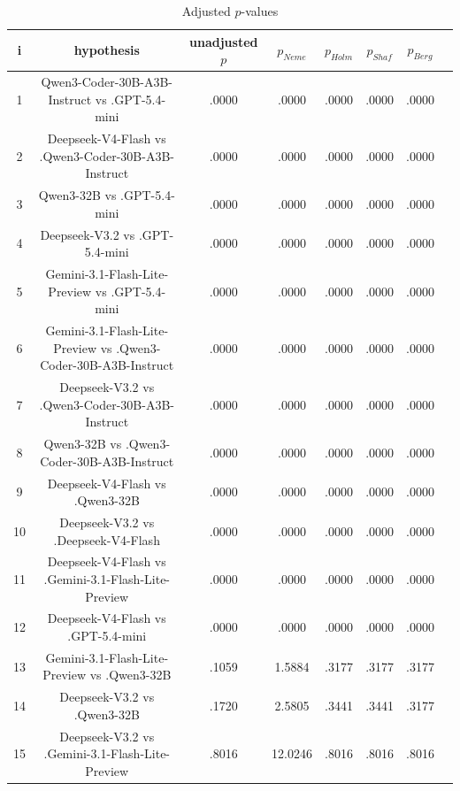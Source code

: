 \documentclass[a4paper,10pt]{article}
\begin{document}
\begin{landscape}
\begin{table}[!htp]
\centering\tiny
\caption{Adjusted $p$-values}
\begin{tabular}{cccccccc}
i&hypothesis&unadjusted $p$&$p_{Neme}$&$p_{Holm}$&$p_{Shaf}$&$p_{Berg}$\\
\hline
1&Qwen3-Coder-30B-A3B-Instruct vs .GPT-5.4-mini&.0000&.0000&.0000&.0000&.0000\\2&Deepseek-V4-Flash vs .Qwen3-Coder-30B-A3B-Instruct&.0000&.0000&.0000&.0000&.0000\\3&Qwen3-32B vs .GPT-5.4-mini&.0000&.0000&.0000&.0000&.0000\\4&Deepseek-V3.2 vs .GPT-5.4-mini&.0000&.0000&.0000&.0000&.0000\\5&Gemini-3.1-Flash-Lite-Preview vs .GPT-5.4-mini&.0000&.0000&.0000&.0000&.0000\\6&Gemini-3.1-Flash-Lite-Preview vs .Qwen3-Coder-30B-A3B-Instruct&.0000&.0000&.0000&.0000&.0000\\7&Deepseek-V3.2 vs .Qwen3-Coder-30B-A3B-Instruct&.0000&.0000&.0000&.0000&.0000\\8&Qwen3-32B vs .Qwen3-Coder-30B-A3B-Instruct&.0000&.0000&.0000&.0000&.0000\\9&Deepseek-V4-Flash vs .Qwen3-32B&.0000&.0000&.0000&.0000&.0000\\10&Deepseek-V3.2 vs .Deepseek-V4-Flash&.0000&.0000&.0000&.0000&.0000\\11&Deepseek-V4-Flash vs .Gemini-3.1-Flash-Lite-Preview&.0000&.0000&.0000&.0000&.0000\\12&Deepseek-V4-Flash vs .GPT-5.4-mini&.0000&.0000&.0000&.0000&.0000\\13&Gemini-3.1-Flash-Lite-Preview vs .Qwen3-32B&.1059&1.5884&.3177&.3177&.3177\\14&Deepseek-V3.2 vs .Qwen3-32B&.1720&2.5805&.3441&.3441&.3177\\15&Deepseek-V3.2 vs .Gemini-3.1-Flash-Lite-Preview&.8016&12.0246&.8016&.8016&.8016\\\hline
\end{tabular}
\end{table}

\end{landscape}
\end{document}

